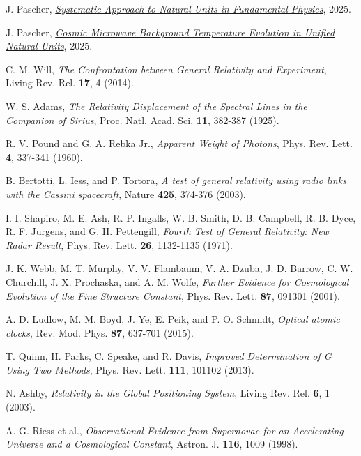 \documentclass[12pt,a4paper]{article}
\begin{document}
\begin{thebibliography}{99}
		J. Pascher, \href{https://github.com/jpascher/T0-Time-Mass-Duality/blob/main/2/pdf/NatEinheitenSystematikEn.pdf}{\textit{Systematic Approach to Natural Units in Fundamental Physics}}, 2025.
		
		
		J. Pascher, \href{https://github.com/jpascher/T0-Time-Mass-Duality/blob/main/2/pdf/TempEinheitenCMBEn.pdf}{\textit{Cosmic Microwave Background Temperature Evolution in Unified Natural Units}}, 2025.
		
		 C. M. Will, \textit{The Confrontation between General Relativity and Experiment}, Living Rev. Rel. \textbf{17}, 4 (2014).
		
		 W. S. Adams, \textit{The Relativity Displacement of the Spectral Lines in the Companion of Sirius}, Proc. Natl. Acad. Sci. \textbf{11}, 382-387 (1925).
		
		 R. V. Pound and G. A. Rebka Jr., \textit{Apparent Weight of Photons}, Phys. Rev. Lett. \textbf{4}, 337-341 (1960).
		
		 B. Bertotti, L. Iess, and P. Tortora, \textit{A test of general relativity using radio links with the Cassini spacecraft}, Nature \textbf{425}, 374-376 (2003).
		
		 I. I. Shapiro, M. E. Ash, R. P. Ingalls, W. B. Smith, D. B. Campbell, R. B. Dyce, R. F. Jurgens, and G. H. Pettengill, \textit{Fourth Test of General Relativity: New Radar Result}, Phys. Rev. Lett. \textbf{26}, 1132-1135 (1971).
		
		 J. K. Webb, M. T. Murphy, V. V. Flambaum, V. A. Dzuba, J. D. Barrow, C. W. Churchill, J. X. Prochaska, and A. M. Wolfe, \textit{Further Evidence for Cosmological Evolution of the Fine Structure Constant}, Phys. Rev. Lett. \textbf{87}, 091301 (2001).
		
		 A. D. Ludlow, M. M. Boyd, J. Ye, E. Peik, and P. O. Schmidt, \textit{Optical atomic clocks}, Rev. Mod. Phys. \textbf{87}, 637-701 (2015).
		
		 T. Quinn, H. Parks, C. Speake, and R. Davis, \textit{Improved Determination of G Using Two Methods}, Phys. Rev. Lett. \textbf{111}, 101102 (2013).
		
		 N. Ashby, \textit{Relativity in the Global Positioning System}, Living Rev. Rel. \textbf{6}, 1 (2003).
		
		 A. G. Riess et al., \textit{Observational Evidence from Supernovae for an Accelerating Universe and a Cosmological Constant}, Astron. J. \textbf{116}, 1009 (1998).
		

\end{thebibliography}
\end{document}
